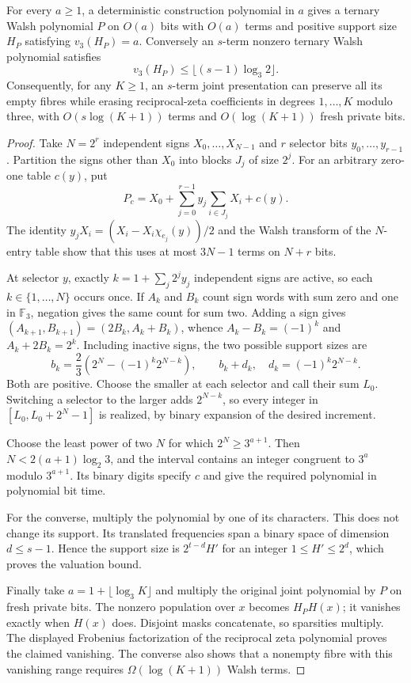 \begin{theorem}
\label{st:multiplier}
For every $a\ge1$, a deterministic construction polynomial in $a$ gives a ternary Walsh polynomial $P$ on $O(a)$ bits with $O(a)$ terms and positive support size $H_P$ satisfying $v_3(H_P)=a$. Conversely an $s$-term nonzero ternary Walsh polynomial satisfies
\[
 v_3(H_P)\le\lfloor(s-1)\log_3 2\rfloor.
\]
Consequently, for any $K\ge1$, an $s$-term joint presentation can preserve all its empty fibres while erasing reciprocal-zeta coefficients in degrees $1,\ldots,K$ modulo three, with $O(s\log(K+1))$ terms and $O(\log(K+1))$ fresh private bits.
\end{theorem}
\begin{proof}
Take $N=2^r$ independent signs $X_0,\ldots,X_{N-1}$ and $r$ selector bits $y_0,\ldots,y_{r-1}$. Partition the signs other than $X_0$ into blocks $J_j$ of size $2^j$. For an arbitrary zero-one table $c(y)$, put
\[
 P_c=X_0+\sum_{j=0}^{r-1}y_j\sum_{i\in J_j}X_i+c(y).
\]
The identity $y_jX_i=(X_i-X_i\chi_{e_j}(y))/2$ and the Walsh transform of the $N$-entry table show that this uses at most $3N-1$ terms on $N+r$ bits.

At selector $y$, exactly $k=1+\sum_j2^jy_j$ independent signs are active, so each $k\in\{1,\ldots,N\}$ occurs once. If $A_k$ and $B_k$ count sign words with sum zero and one in $\mathbb F_3$, negation gives the same count for sum two. Adding a sign gives $(A_{k+1},B_{k+1})=(2B_k,A_k+B_k)$, whence $A_k-B_k=(-1)^k$ and $A_k+2B_k=2^k$. Including inactive signs, the two possible support sizes are
\[
 b_k=\frac23(2^N-(-1)^k2^{N-k}),\qquad
 b_k+d_k,\quad d_k=(-1)^k2^{N-k}.
\]
Both are positive. Choose the smaller at each selector and call their sum $L_0$. Switching a selector to the larger adds $2^{N-k}$, so every integer in $[L_0,L_0+2^N-1]$ is realized, by binary expansion of the desired increment.

Choose the least power of two $N$ for which $2^N\ge3^{a+1}$. Then $N<2(a+1)\log_2 3$, and the interval contains an integer congruent to $3^a$ modulo $3^{a+1}$. Its binary digits specify $c$ and give the required polynomial in polynomial bit time.

For the converse, multiply the polynomial by one of its characters. This does not change its support. Its translated frequencies span a binary space of dimension $d\le s-1$. Hence the support size is $2^{t-d}H'$ for an integer $1\le H'\le2^d$, which proves the valuation bound.

Finally take $a=1+\lfloor\log_3K\rfloor$ and multiply the original joint polynomial by $P$ on fresh private bits. The nonzero population over $x$ becomes $H_PH(x)$; it vanishes exactly when $H(x)$ does. Disjoint masks concatenate, so sparsities multiply. The displayed Frobenius factorization of the reciprocal zeta polynomial proves the claimed vanishing. The converse also shows that a nonempty fibre with this vanishing range requires $\Omega(\log(K+1))$ Walsh terms.
\end{proof}
